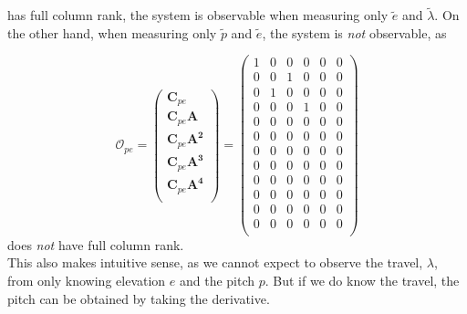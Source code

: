 has full column rank, the system is observable when measuring only $\tilde e$ and $\tilde \lambda$. On the other hand, when measuring only $\tilde p$ and $\tilde e$, the system is \textit{not} observable, as

\begin{equation}
    \mathbf{\mathcal{O}}_{pe} = 
        \begin{pmatrix}
        \mathbf{C}_{pe}               \\
        \mathbf{C}_{pe}\mathbf{A}     \\
        \mathbf{C}_{pe}\mathbf{A^2}   \\
        \mathbf{C}_{pe}\mathbf{A^3}   \\
        \mathbf{C}_{pe}\mathbf{A^4}   \\
    \end{pmatrix}
    = \begin{pmatrix}
    1 & 0 & 0 & 0 & 0 & 0 \\
    0 & 0 & 1 & 0 & 0 & 0 \\
    0 & 1 & 0 & 0 & 0 & 0 \\
    0 & 0 & 0 & 1 & 0 & 0 \\
    0 & 0 & 0 & 0 & 0 & 0 \\
    0 & 0 & 0 & 0 & 0 & 0 \\
    0 & 0 & 0 & 0 & 0 & 0 \\
    0 & 0 & 0 & 0 & 0 & 0 \\
    0 & 0 & 0 & 0 & 0 & 0 \\
    0 & 0 & 0 & 0 & 0 & 0 \\
    0 & 0 & 0 & 0 & 0 & 0 \\
    0 & 0 & 0 & 0 & 0 & 0 \\
    \end{pmatrix}
\end{equation}
does \textit{not} have full column rank.\\
This also makes intuitive sense, as we cannot expect to observe the travel, $\lambda$, from only knowing elevation $e$ and the pitch $p$. But if we do know the travel, the pitch can be obtained by taking the derivative.  

